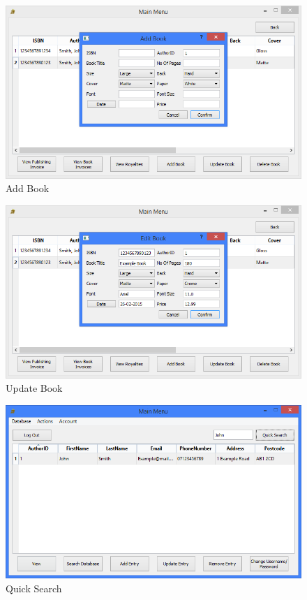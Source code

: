 \begin{figure}[H]
    \caption{Add Book} \label{fig:AddBook}
    \includegraphics[width=\textwidth]{./Maintenance/UserInterface/AddBook.png}
\end{figure}

\begin{figure}[H]
    \caption{Update Book} \label{fig:UpdateBook}
    \includegraphics[width=\textwidth]{./Maintenance/UserInterface/UpdateBook.png}
\end{figure}

\begin{figure}[H]
    \caption{Quick Search} \label{fig:QuickSearch}
    \includegraphics[width=\textwidth]{./Maintenance/UserInterface/QuickSearch.png}
\end{figure}

